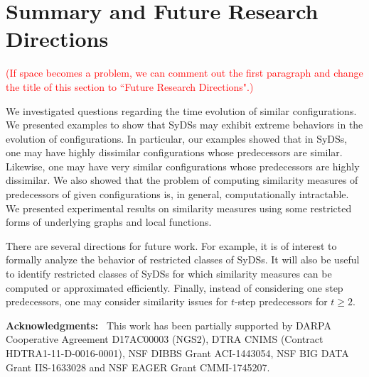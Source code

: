 \section{Summary and Future Research Directions}
\label{sec:concl}

\textcolor{red}{(If space becomes a problem, we can comment out
the first paragraph and change the title of this section
to ``Future Research Directions".)}

We investigated questions regarding the time evolution of
similar configurations.
We presented examples to show that SyDSs may exhibit
extreme behaviors in the evolution of configurations. 
In particular, our examples showed that in SyDSs, one may have
highly dissimilar configurations whose predecessors are similar.
Likewise, one may have very similar configurations whose predecessors
are highly dissimilar.
We also showed that the problem of computing similarity
measures of predecessors of given configurations is, in general,
computationally intractable.
We presented experimental results on similarity measures using
some restricted forms of underlying graphs and local functions.

There are several directions for future work.
For example, it is of interest to formally analyze the
behavior of restricted classes of SyDSs.
It will also be useful to identify restricted classes of SyDSs
for which similarity measures can be computed or approximated efficiently.
Finally, instead of considering one step predecessors, one may consider 
similarity issues for $t$-step predecessors for $t \geq 2$.

\smallskip

\noindent
\textbf{Acknowledgments:}~
This work has been partially supported by
DARPA Cooperative Agreement D17AC00003 (NGS2),
DTRA CNIMS (Contract HDTRA1-11-D-0016-0001),
NSF DIBBS Grant ACI-1443054,
NSF BIG DATA Grant IIS-1633028 and
NSF EAGER Grant CMMI-1745207.


